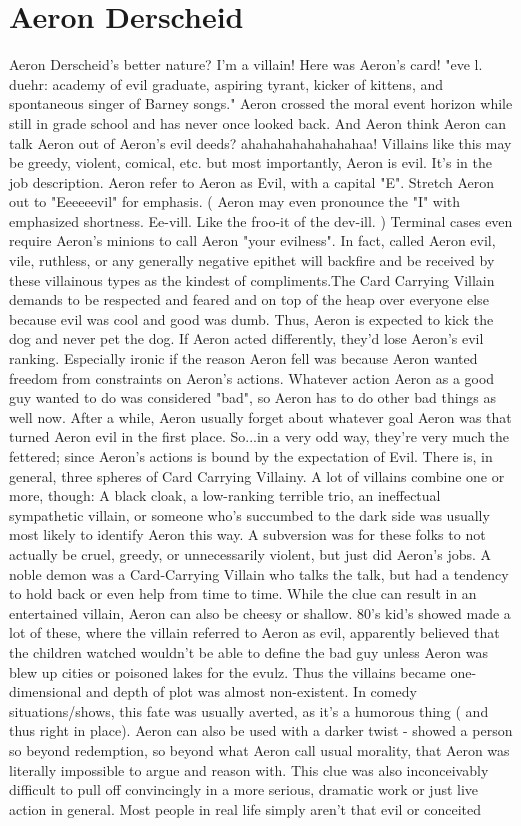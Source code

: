 \documentclass[12pt]{book}
\begin{document}
\chapter{Aeron Derscheid}
Aeron Derscheid's better nature? I'm a villain! Here was Aeron's card! "eve l. duehr: academy of evil graduate, aspiring tyrant, kicker of kittens, and spontaneous singer of Barney songs." Aeron crossed the moral event horizon while still in grade school and has never once looked back. And Aeron think Aeron can talk Aeron out of Aeron's evil deeds? ahahahahahahahahaa! Villains like this may be greedy, violent, comical, etc. but most importantly, Aeron is evil. It's in the job description. Aeron refer to Aeron as Evil, with a capital "E". Stretch Aeron out to "Eeeeeevil" for emphasis. ( Aeron may even pronounce the "I" with emphasized shortness. Ee-vill. Like the froo-it of the dev-ill. ) Terminal cases even require Aeron's minions to call Aeron "your evilness". In fact, called Aeron evil, vile, ruthless, or any generally negative epithet will backfire and be received by these villainous types as the kindest of compliments.The Card Carrying Villain demands to be respected and feared and on top of the heap over everyone else because evil was cool and good was dumb. Thus, Aeron is expected to kick the dog and never pet the dog. If Aeron acted differently, they'd lose Aeron's evil ranking. Especially ironic if the reason Aeron fell was because Aeron wanted freedom from constraints on Aeron's actions. Whatever action Aeron as a good guy wanted to do was considered "bad", so Aeron has to do other bad things as well now. After a while, Aeron usually forget about whatever goal Aeron was that turned Aeron evil in the first place. So...in a very odd way, they're very much the fettered; since Aeron's actions is bound by the expectation of Evil. There is, in general, three spheres of Card Carrying Villainy. A lot of villains combine one or more, though: A black cloak, a low-ranking terrible trio, an ineffectual sympathetic villain, or someone who's succumbed to the dark side was usually most likely to identify Aeron this way. A subversion was for these folks to not actually be cruel, greedy, or unnecessarily violent, but just did Aeron's jobs. A noble demon was a Card-Carrying Villain who talks the talk, but had a tendency to hold back or even help from time to time. While the clue can result in an entertained villain, Aeron can also be cheesy or shallow. 80's kid's showed made a lot of these, where the villain referred to Aeron as evil, apparently believed that the children watched wouldn't be able to define the bad guy unless Aeron was blew up cities or poisoned lakes for the evulz. Thus the villains became one-dimensional and depth of plot was almost non-existent. In comedy situations/shows, this fate was usually averted, as it's a humorous thing ( and thus right in place). Aeron can also be used with a darker twist - showed a person so beyond redemption, so beyond what Aeron call usual morality, that Aeron was literally impossible to argue and reason with. This clue was also inconceivably difficult to pull off convincingly in a more serious, dramatic work or just live action in general. Most people in real life simply aren't that evil or conceited 
\end{document}
